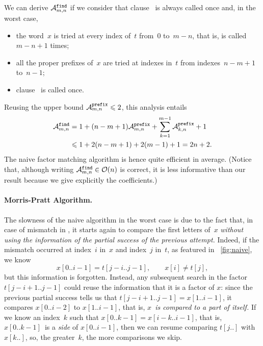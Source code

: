 We can derive \(\ave{find}{m,n}\) if we consider that
clause~\clause{\alpha} is always called once and, in the worst case,
\begin{itemize}

  \item the word~\(x\) is tried at every index of~\(t\) from~\(0\)
    to~\(m-n\), that is,  is called \(m-n+1\) times;

  \item all the proper prefixes of~\(x\) are tried at indexes in~\(t\)
    from indexes~\(n-m+1\) to~\(n-1\);

  \item clause~\clause{\beta} is called once.

\end{itemize}
Reusing the upper bound \(\ave{prefix}{m,n} \leqslant 2\), this
analysis entails
\begin{align*}
\ave{find}{m,n}
  &= 1 + (n-m+1) \ave{prefix}{m,n}
       + \sum_{k=1}^{m-1}{\ave{prefix}{k,n}} + 1\\
  &\leqslant 1 + 2(n-m+1) + 2 (m-1) + 1 
   = 2n + 2.
\end{align*}
The naive factor matching algorithm is hence quite efficient in
average. (Notice that, although writing \(\ave{find}{m,n} \in
\bachmann{n}\) is correct, it is less informative than our result
because we give explicitly the coefficients.)

\medskip

\paragraph{Morris\hyp{}Pratt Algorithm.}

The slowness of the naive algorithm in the worst case is due to the
fact that, in case of mismatch in , it starts again
to compare the first letters of~\(x\) \emph{without using the
  information of the partial success of the previous attempt.} Indeed,
if the mismatch occurred at index~\(i\) in~\(x\) and index~\(j\)
in~\(t\), as featured in \fig~\vref{fig:naive}, we know
\[
x[0..i-1] = t[j-i..j-1],\qquad x[i] \neq t[j],
\]
but this information is forgotten. Instead, any subsequent search in
the factor \(t[j-i+1..j-1]\) could reuse the information that it is a
factor of \(x\): since the previous partial success tells us that
\(t[j-i+1..j-1] = x[1..i-1]\), it compares \(x[0..i-2]\) to
\(x[1..i-1]\), that is, \emph{\(x\)~is compared to a part of itself.}
If we know an index~\(k\) such that \(x[0..k-1]=x[i-k..i-1]\), that
is, \(x[0..k-1]\)~is a \emph{side} of \(x[0..i-1]\), then we can
resume comparing \(t[j..]\) with \(x[k..]\), so, the greater~\(k\),
the more comparisons we skip.

